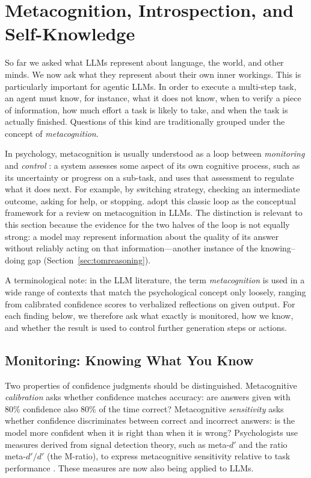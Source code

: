 \section{Metacognition, Introspection, and Self-Knowledge} \label{sec:metacognition}
So far we asked what LLMs represent about language, the world, and other minds. We now ask what they represent about their own inner workings. This is particularly important for agentic LLMs. In order to execute a multi-step task, an agent must know, for instance, what it does not know, when to verify a piece of information, how much effort a task is likely to take, and when the task is actually finished. Questions of this kind are traditionally grouped under the concept of \emph{metacognition}.

In psychology, metacognition is usually understood as a loop between \emph{monitoring} and \emph{control} \citep{nelson1990meta}: a system assesses some aspect of its own cognitive process, such as its uncertainty or progress on a sub-task, and uses that assessment to regulate what it does next. For example, by switching strategy, checking an intermediate outcome, asking for help, or stopping. \citet{liu2026metacog} adopt this classic loop as the conceptual framework for a review on metacognition in LLMs. The distinction is relevant to this section because the evidence for the two halves of the loop is not equally strong: a model may represent information about the quality of its answer without reliably acting on that information---another instance of the knowing--doing gap (Section~\ref{sec:tomreasoning}).

A terminological note: in the LLM literature, the term \emph{metacognition} is used in a wide range of contexts that match the psychological concept only loosely, ranging from calibrated confidence scores to verbalized reflections on given output. For each finding below, we therefore ask what exactly is monitored, how we know, and whether the result is used to control further generation steps or actions.

\subsection{Monitoring: Knowing What You Know}
Two properties of confidence judgments should be distinguished. Metacognitive \emph{calibration} asks whether confidence matches accuracy: are answers given with 80\% confidence also 80\% of the time correct? Metacognitive \emph{sensitivity} asks whether confidence discriminates between correct and incorrect answers: is the model more confident when it is right than when it is wrong? Psychologists use measures derived from signal detection theory, such as meta-$d'$ and the ratio meta-$d'/d'$ (the M-ratio), to express metacognitive sensitivity relative to task performance \citep{maniscalco2012signal}. These measures are now also being applied to LLMs. 

